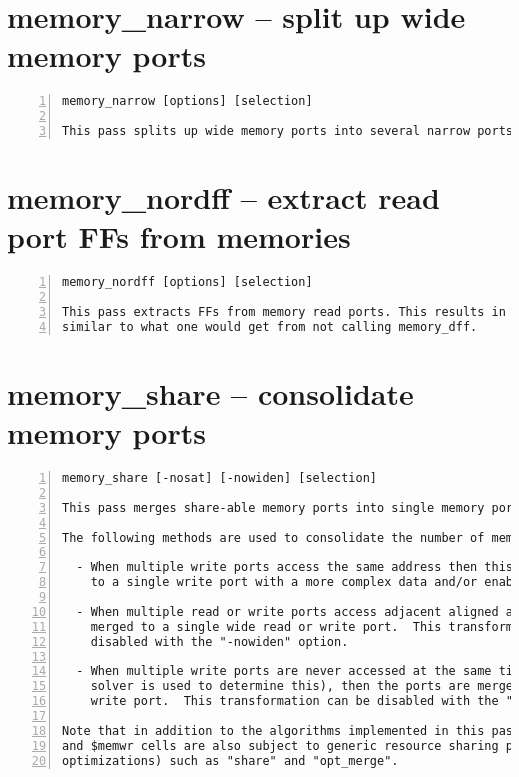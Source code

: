 \section{memory\_narrow -- split up wide memory ports}
\label{cmd:memory_narrow}
\begin{lstlisting}[numbers=left,frame=single]
    memory_narrow [options] [selection]

This pass splits up wide memory ports into several narrow ports.
\end{lstlisting}

\section{memory\_nordff -- extract read port FFs from memories}
\label{cmd:memory_nordff}
\begin{lstlisting}[numbers=left,frame=single]
    memory_nordff [options] [selection]

This pass extracts FFs from memory read ports. This results in a netlist
similar to what one would get from not calling memory_dff.
\end{lstlisting}

\section{memory\_share -- consolidate memory ports}
\label{cmd:memory_share}
\begin{lstlisting}[numbers=left,frame=single]
    memory_share [-nosat] [-nowiden] [selection]

This pass merges share-able memory ports into single memory ports.

The following methods are used to consolidate the number of memory ports:

  - When multiple write ports access the same address then this is converted
    to a single write port with a more complex data and/or enable logic path.

  - When multiple read or write ports access adjacent aligned addresses, they are
    merged to a single wide read or write port.  This transformation can be
    disabled with the "-nowiden" option.

  - When multiple write ports are never accessed at the same time (a SAT
    solver is used to determine this), then the ports are merged into a single
    write port.  This transformation can be disabled with the "-nosat" option.

Note that in addition to the algorithms implemented in this pass, the $memrd
and $memwr cells are also subject to generic resource sharing passes (and other
optimizations) such as "share" and "opt_merge".
\end{lstlisting}

